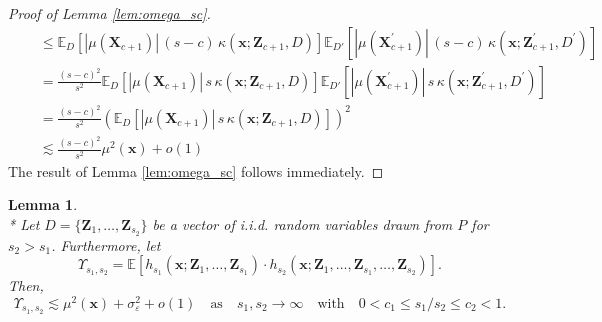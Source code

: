 \documentclass[letterpaper,10pt]{article}
\numberwithin{equation}{section}
\numberwithin{thm}{section}
\newtheorem{lem}{Lemma}
\numberwithin{lem}{section}
\numberwithin{cor}{section}
\newcommand{\E}{\mathbb{E}}
\newcommand{\1}{\mathbbm{1}}
\begin{document}
\begin{proof}[Proof of Lemma \ref{lem:omega_sc}]
\begin{equation}
\begin{aligned}
			 & \quad \leq \E_{D}\left[|\mu(\mathbf{X}_{c+1})|\, (s-c) \, \kappa\left(\mathbf{x}; \mathbf{Z}_{c+1}, D\right)\right]
			\E_{D'}\left[|\mu(\mathbf{X}_{c+1}^{\prime})|\, (s-c) \, \kappa\left(\mathbf{x}; \mathbf{Z}_{c+1}^{\prime}, D^{\prime}\right)\right]                                                                                      \\
			 & \quad = \frac{(s-c)^2}{s^2} \E_{D}\left[|\mu(\mathbf{X}_{c+1})|\, s \, \kappa\left(\mathbf{x}; \mathbf{Z}_{c+1}, D\right)\right]
			\E_{D'}\left[|\mu(\mathbf{X}_{c+1}^{\prime})|\, s \, \kappa\left(\mathbf{x}; \mathbf{Z}_{c+1}^{\prime}, D^{\prime}\right)\right]                                                                                          \\
			 & \quad = \frac{(s-c)^2}{s^2} \left(\E_{D}\left[|\mu(\mathbf{X}_{c+1})|\, s \, \kappa\left(\mathbf{x}; \mathbf{Z}_{c+1}, D\right)\right]\right)^2                                                                        \\
			 & \quad \lesssim \frac{(s-c)^2}{s^2}\mu^2(\mathbf{x}) + o(1)
		\end{aligned}
	\end{equation}
	The result of Lemma \ref{lem:omega_sc} follows immediately.
\end{proof}

\newpage
\begin{lem}\label{lem:upsilon_s}\mbox{}\\*
	Let $D = \{\mathbf{Z}_1, \dotsc, \mathbf{Z}_{s_2}\}$ be a vector of i.i.d. random variables drawn from $P$ for $s_2 > s_1$.
	Furthermore, let
	\begin{equation}
		\Upsilon_{s_1, s_2}
		= \E\left[h_{s_1}\left(\mathbf{x}; \mathbf{Z}_1, \ldots,  \mathbf{Z}_{s_1}\right) \cdot
			h_{s_2}\left(\mathbf{x}; \mathbf{Z}_1, \ldots,\mathbf{Z}_{s_1}, \ldots, \mathbf{Z}_{s_2}\right)\right].
	\end{equation}
	Then,
	\begin{equation}
		\Upsilon_{s_1, s_2}
		\lesssim \mu^{2}\left(\mathbf{x}\right) + \sigma^2_{\varepsilon} + o(1)
		\quad \text{as} \quad s_1, s_2 \rightarrow \infty
		\quad \text{with} \quad
		0 < c_1 \leq s_1 / s_2 \leq c_2 < 1.
	\end{equation}
\end{lem}
\end{document}
